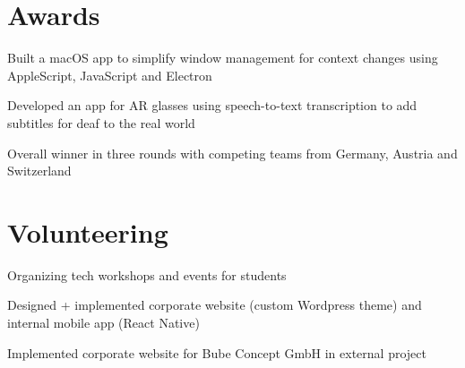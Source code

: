 \documentclass[]{florian_mueller_cv}
\begin{document}
\begin{minipage}[t]{0.66\textwidth}

\section{Awards}

\begin{tightemize}\item Built a macOS app to simplify window management for context changes using AppleScript, JavaScript and Electron
\end{tightemize}
\sectionsep

\begin{tightemize}\item Developed an app for AR glasses using speech-to-text transcription to add subtitles for deaf to the real world \item Overall winner in three rounds with competing teams from Germany, Austria and Switzerland
\end{tightemize}


\section{Volunteering}
\begin{tightemize}
\item Organizing tech workshops and events for students\end{tightemize}
\sectionsep

\begin{tightemize}
\item Designed + implemented corporate website (custom Wordpress theme) and internal mobile app (React Native)\item Implemented corporate website for Bube Concept GmbH in external project\end{tightemize}
\sectionsep


\end{minipage} 
\end{document}
